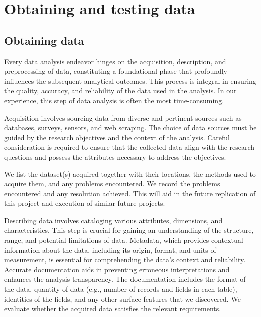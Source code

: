 
\section{Obtaining and testing data} %
\label{sec:obtaining_and_testing_data}

\subsection{Obtaining data}
\label{sub:obtaining_data}


Every data analysis endeavor hinges on the acquisition, description, and preprocessing of data, constituting a foundational phase that profoundly influences the subsequent analytical outcomes. This process is integral in ensuring the quality, accuracy, and reliability of the data used in the analysis. In our experience, this step of data analysis is often the most time-consuming.

Acquisition involves sourcing data from diverse and pertinent sources such as databases, surveys, sensors, and web scraping. The choice of data sources must be guided by the research objectives and the context of the analysis. Careful consideration is required to ensure that the collected data align with the research questions and possess the attributes necessary to address the objectives.

We list the dataset(s) acquired together with their locations, the methods used to acquire them, and any problems encountered. We record the problems encountered and any resolution achieved. This will aid in the future replication of this project and execution of similar future projects.

Describing data involves cataloging various attributes, dimensions, and characteristics. This step is crucial for gaining an understanding of the structure, range, and potential limitations of data. Metadata, which provides contextual information about the data, including its origin, format, and units of measurement, is essential for comprehending the data's context and reliability. Accurate documentation aids in preventing erroneous interpretations and enhances the analysis transparency. The documentation includes the format of the data, quantity of data (e.g., number of records and fields in each table), identities of the fields, and any other surface features that we discovered. We evaluate whether the acquired data satisfies the relevant requirements.

